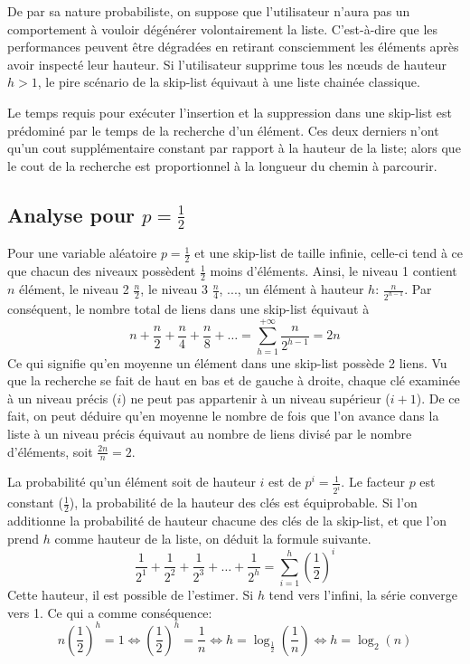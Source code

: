 \documentclass[hidelinks,a4paper, 12pt]{article}
\begin{document}
	De par sa nature probabiliste, on suppose que l'utilisateur n'aura pas un comportement à vouloir dégénérer volontairement la liste. C'est-à-dire que les performances peuvent être dégradées en retirant consciemment les éléments après avoir inspecté leur hauteur. Si l'utilisateur supprime tous les nœuds de hauteur $h>1$, le pire scénario de la skip-list équivaut à une liste chainée classique.
	
	Le temps requis pour exécuter l'insertion et la suppression dans une skip-list est prédominé par le temps de la recherche d'un élément. Ces deux derniers n'ont qu'un cout supplémentaire constant par rapport à la hauteur de la liste; alors que le cout de la recherche est proportionnel à la longueur du chemin à parcourir.
	
	
	\subsection{Analyse pour $p=\frac{1}{2}$}
	Pour une variable aléatoire $p=\frac{1}{2}$ et une skip-list de taille infinie, celle-ci tend à ce que chacun des niveaux possèdent $\frac{1}{2}$ moins d'éléments. Ainsi, le niveau 1 contient $n$ élément, le niveau 2 $\frac{n}{2}$, le niveau 3 $\frac{n}{4}$, ..., un élément à hauteur $h$: $\frac{n}{{2}^{h-1}}$. Par conséquent, le nombre total de liens dans une skip-list équivaut à \[n+\frac{n}{2}+\frac{n}{4}+\frac{n}{8}+\dots = \sum_{h=1}^{+\infty}\frac{n}{{2}^{h-1}}=2n\] Ce qui signifie qu'en moyenne un élément dans une skip-list possède 2 liens. Vu que la recherche se fait de haut en bas et de gauche à droite, chaque clé examinée à un niveau précis ($i$) ne peut pas appartenir à un niveau supérieur ($i+1$).
	De ce fait, on peut déduire qu'en moyenne le nombre de fois que l'on avance dans la liste à un niveau précis équivaut au nombre de liens divisé par le nombre d'éléments, soit $\frac{2n}{n}=2$.
	
	\newpage
	La probabilité qu'un élément soit de hauteur $i$ est de ${p^{i}} = \frac{1}{2^{i}} $. Le facteur $p$ est constant ($\frac{1}{2}$), la probabilité de la hauteur des clés est équiprobable. Si l'on additionne la probabilité de hauteur chacune des clés de la skip-list, et que l'on prend $h$ comme hauteur de la liste, on déduit la formule suivante.
	\[
		\frac{1}{{2}^{1}}+\frac{1}{{2}^{2}}+\frac{1}{{2}^{3}}+\dots+\frac{1}{{2}^{h}}
		= \sum _{i=1}^{h} ({\frac{1}{2}})^{i}
	\]
	Cette hauteur, il est possible de l'estimer. Si $h$ tend vers l'infini, la série converge vers 1. Ce qui a comme conséquence:
	\[
		n{(\frac{1}{2})}^{h} = 1
		\iff {(\frac{1}{2})}^{h}=\frac{1}{n}
		\iff h = \log_{\frac{1}{2}}(\frac{1}{n})
		\iff h = \log_{2}(n)
	\]
	
\end{document}
